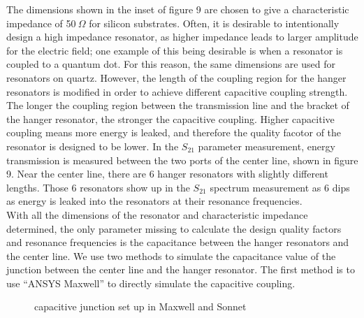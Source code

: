 \documentclass[11pt]{article}
\numberwithin{equation}{section}
\begin{document}
The dimensions shown in the inset of figure 9 are chosen to give a characteristic impedance of 50\(\ \Omega \) for silicon substrates.  Often, it is desirable to intentionally design a high impedance resonator, as higher impedance leads to larger amplitude for the electric field; one example of this being desirable is when a resonator is coupled to a quantum dot. For this reason, the same dimensions are used for resonators on quartz.  However, the length of the coupling region for the hanger resonators is modified in order to achieve different capacitive coupling strength. The longer the coupling region between the transmission line and the bracket of the hanger resonator, the stronger the capacitive coupling.  Higher capacitive coupling means more energy is leaked, and therefore the quality facotor of the resonator is designed to be lower. In the $S_{21}$ parameter measurement, energy transmission is measured between the two ports of the center line, shown in figure 9.  Near the center line, there are 6 hanger resonators with slightly different lengths.  Those 6 resonators show up in the $S_{21}$ spectrum measurement as 6 dips as energy is leaked into the resonators at their resonance frequencies. \\

With all the dimensions of the resonator and characteristic impedance determined, the only parameter missing to calculate the design quality factors and resonance frequencies is the capacitance between the hanger resonators and the center line.  We use two methods to simulate the capacitance value of the junction between the center line and the hanger resonator.  The first method is to use ``ANSYS Maxwell'' to directly simulate the capacitive coupling.  

\begin{figure}%
    \centering
    \qquad
    \caption{capacitive junction set up in Maxwell and Sonnet}%
    \label{fig:example}%
\end{figure} 






\end{document}
